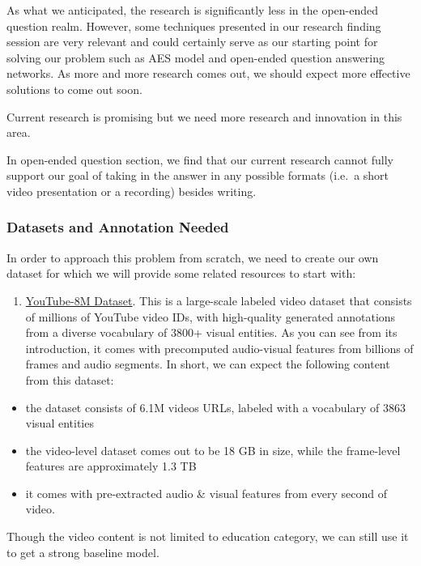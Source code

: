 \documentclass[]{book}
\providecommand{\tightlist}{%
  \setlength{\itemsep}{0pt}\setlength{\parskip}{0pt}}
\theoremstyle{definition}
\theoremstyle{definition}
\theoremstyle{definition}
\theoremstyle{remark}
\begin{document}
As what we anticipated, the research is significantly less in the
open-ended question realm. However, some techniques presented in our
research finding session are very relevant and could certainly serve as
our starting point for solving our problem such as AES model and
open-ended question answering networks. As more and more research comes
out, we should expect more effective solutions to come out soon.

Current research is promising but we need more research and innovation
in this area.

In open-ended question section, we find that our current research cannot
fully support our goal of taking in the answer in any possible formats
(i.e.~a short video presentation or a recording) besides writing.

\subsubsection{Datasets and Annotation
Needed}\label{datasets-and-annotation-needed}

In order to approach this problem from scratch, we need to create our
own dataset for which we will provide some related resources to start
with:

\begin{enumerate}
\def\labelenumi{\arabic{enumi}.}
\tightlist
\item
  \href{https://research.google.com/youtube8m/}{YouTube-8M Dataset}.
  This is a large-scale labeled video dataset that consists of millions
  of YouTube video IDs, with high-quality generated annotations from a
  diverse vocabulary of 3800+ visual entities. As you can see from its
  introduction, it comes with precomputed audio-visual features from
  billions of frames and audio segments. In short, we can expect the
  following content from this dataset:
\end{enumerate}

\begin{itemize}
\item
  the dataset consists of 6.1M videos URLs, labeled with a vocabulary of
  3863 visual entities
\item
  the video-level dataset comes out to be 18 GB in size, while the
  frame-level features are approximately 1.3 TB
\item
  it comes with pre-extracted audio \& visual features from every second
  of video.
\end{itemize}

Though the video content is not limited to education category, we can
still use it to get a strong baseline model.
\end{document}
